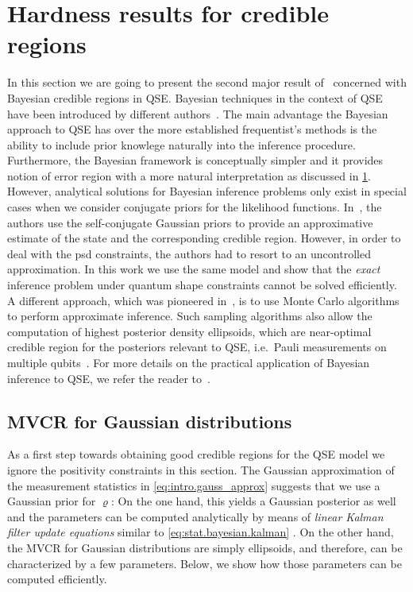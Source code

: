 \section{Hardness results for credible regions}
\label{sec:error.bayesian}

In this section we are going to present the second major result of~\cite{Suess_2016_Error} concerned with Bayesian credible regions in QSE.
Bayesian techniques in the context of QSE have been introduced by different authors~\cite{Jones_1991_Principles,Slater_1995_Quantum,Derka_1997_From,Schack_2001_Quantum,Buzek_1998_Reconstruction}.
The main advantage the Bayesian approach to QSE has over the more established frequentist's methods is the ability to include prior knowlege naturally into the inference procedure.
Furthermore, the Bayesian framework is conceptually simpler and it provides notion of error region with a more natural interpretation as discussed in \cref{sec:error.bayesian}.
However, analytical solutions for Bayesian inference problems only exist in special cases when we consider conjugate priors for the likelihood functions.
In~\cite{Audenaert_2009_Quantum}, the authors use the self-conjugate Gaussian priors to provide an approximative estimate of the state and the corresponding credible region.
However, in order to deal with the psd constraints, the authors had to resort to an uncontrolled approximation.
In this work we use the same model and show that the \emph{exact} inference problem under quantum shape constraints cannot be solved efficiently.
A different approach, which was pioneered in~\cite{Huszar_2012_Adaptive,Ferrie_2014_Quantum}, is to use Monte Carlo algorithms to perform approximate inference.
Such sampling algorithms also allow the computation of highest posterior density ellipsoids, which are near-optimal credible region for the posteriors relevant to QSE, i.e.\ Pauli measurements on multiple qubits~\cite{Ferrie_2014_High}.
For more details on the practical application of Bayesian inference to QSE, we refer the reader to~\cite{Granade_2016_Practicala}.


\subsection{MVCR for Gaussian distributions}
\label{sub:bayesian.gaussian}

As a first step towards obtaining good credible regions for the QSE model we ignore the positivity constraints in this section.
The Gaussian approximation of the measurement statistics in \cref{eq:intro.gauss_approx} suggests that we use a Gaussian prior for $\varrho$:
On the one hand, this yields a Gaussian posterior as well and the parameters can be computed analytically by means of \emph{linear Kalman filter update equations} similar to \cref{eq:stat.bayesian.kalman} \cite[Sec.\ 2.4]{Audenaert_2009_Quantum}.
On the other hand, the MVCR for Gaussian distributions are simply ellipsoids, and therefore, can be characterized by a few parameters.
Below, we show how those parameters can be computed efficiently.

